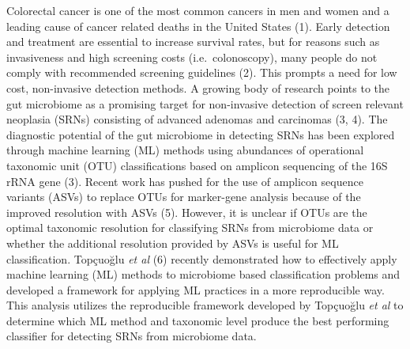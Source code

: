 \documentclass[
]{article}
\begin{document}
\newpage

Colorectal cancer is one of the most common cancers in men and women and
a leading cause of cancer related deaths in the United States (1). Early
detection and treatment are essential to increase survival rates, but
for reasons such as invasiveness and high screening costs
(i.e.~colonoscopy), many people do not comply with recommended screening
guidelines (2). This prompts a need for low cost, non-invasive detection
methods. A growing body of research points to the gut microbiome as a
promising target for non-invasive detection of screen relevant neoplasia
(SRNs) consisting of advanced adenomas and carcinomas (3, 4). The
diagnostic potential of the gut microbiome in detecting SRNs has been
explored through machine learning (ML) methods using abundances of
operational taxonomic unit (OTU) classifications based on amplicon
sequencing of the 16S rRNA gene (3). Recent work has pushed for the use
of amplicon sequence variants (ASVs) to replace OTUs for marker-gene
analysis because of the improved resolution with ASVs (5). However, it
is unclear if OTUs are the optimal taxonomic resolution for classifying
SRNs from microbiome data or whether the additional resolution provided
by ASVs is useful for ML classification. Topçuoğlu \emph{et al} (6)
recently demonstrated how to effectively apply machine learning (ML)
methods to microbiome based classification problems and developed a
framework for applying ML practices in a more reproducible way. This
analysis utilizes the reproducible framework developed by Topçuoğlu
\emph{et al} to determine which ML method and taxonomic level produce
the best performing classifier for detecting SRNs from microbiome data.
\end{document}

